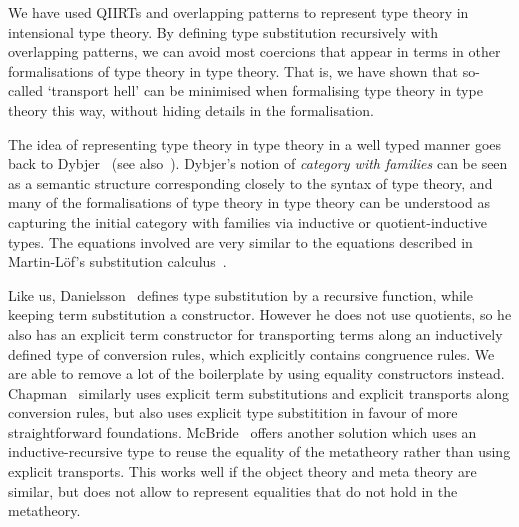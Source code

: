 \documentclass[a4paper,UKenglish,numberwithinsect,cleveref,thm-restate]{lipics-v2021}
\begin{document}
We have used QIIRTs and overlapping
patterns to represent type theory in intensional type theory. By defining type
substitution recursively with overlapping patterns, we can avoid most
coercions that appear in terms in other formalisations of type
theory in type theory. That is, we have shown that so-called
`transport hell' can be minimised when formalising type theory in type
theory this way, without hiding details in the formalisation.


The idea of representing type theory in type theory in a well typed manner goes back to Dybjer~\cite{Dybjer1996} (see also~\cite{Clairambault2014,Castellan2021}). Dybjer's notion of \emph{category with families} can be seen as a semantic structure corresponding closely to the syntax of type theory, and many of the formalisations of type theory in type theory can be understood as capturing the initial category with families via inductive or quotient-inductive types. The equations involved are very similar to the equations described in Martin-L\"of's substitution calculus~\cite{Martin-Lof1992}.

Like us, Danielsson~\cite{Danielsson2006} defines type substitution by a recursive function, while keeping term substitution a constructor. However he does not use quotients, so he also has an explicit term constructor for transporting terms along an inductively defined type of conversion rules, which explicitly contains congruence rules. We are able to remove a lot of the boilerplate by using equality constructors instead. Chapman~\cite{Chapman2009} similarly uses explicit term substitutions and explicit transports along conversion rules, but also uses explicit type substitition in favour of more straightforward foundations.
McBride~\cite{McBride2010} offers another solution which uses an inductive-recursive type to reuse the equality of the metatheory rather than using explicit transports. This works well if the object theory and meta theory are similar, but does not allow to represent equalities that do not hold in the metatheory.
\end{document}
